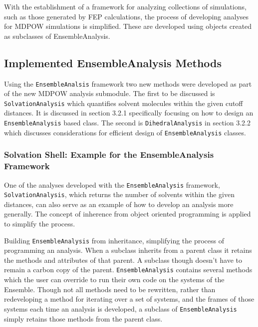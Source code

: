 \documentclass{article}[letterpaper, margins=1in, 12pt]
\begin{document}
With the establishment of a framework for analyzing collections of simulations, such as those generated by FEP calculations, the process of developing analyses for MDPOW simulations is simplified.  These are developed using objects created as subclasses of EnsembleAnalysis.

\subsection{Implemented EnsembleAnalysis Methods}
Using the \texttt{EnsembleAnalsis} framework two new methods were developed as part of the new MDPOW analysis submodule. The first to be discussed is \texttt{SolvationAnalysis} which quantifies solvent molecules within the given cutoff distances. It is discussed in section 3.2.1 specifically focusing on how to design an \texttt{EnsembleAnalysis} based class. The second is \texttt{DihedralAnalysis} in section 3.2.2 which discusses considerations for efficient design of \texttt{EnsembleAnalysis} classes.

\subsubsection{Solvation Shell: Example for the EnsembleAnalysis Framework}

One of the analyses developed with the \texttt{EnsembleAnalysis} framework, \texttt{SolvationAnalysis}, which returns the number of solvents within the given distances, can also serve as an example of how to develop an analysis more generally. The concept of inherence from object oriented programming is applied to simplify the process.

Building \texttt{EnsembleAnalysis} from inheritance, simplifying the process of programming an analysis. When a subclass inherits from a parent class it retains the methods and attributes of that parent. A subclass though doesn't have to remain a carbon copy of the parent. \texttt{EnsembleAnalysis} contains several methods which the user can override to run their own code on the systems of the Ensemble. Though not all methods need to be rewritten, rather than redeveloping a method for iterating over a set of systems, and the frames of those systems each time an analysis is developed, a subclass of \texttt{EnsembleAnalysis} simply retains those methods from the parent class. 
\end{document}
